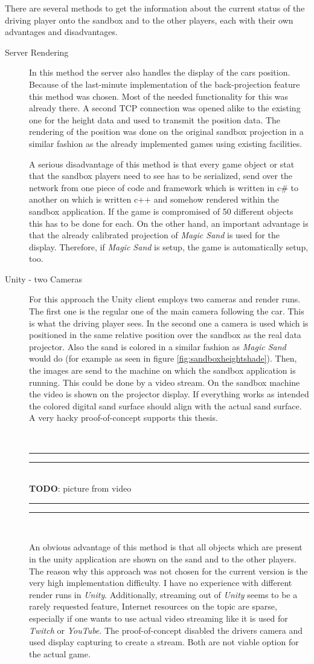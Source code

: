 \documentclass[12pt,a4paper,twoside,titlepage,headsepline,numbers=noenddot,listof=totoc,index=totoc,bibliography=totoc]{scrartcl}
\theoremstyle{break}
\providecommand{\TODO}[1]{{\small ~\\\hrule\vspace{0.1cm}\hrule~\\\textbf{TODO}:  #1~\\\hrule\vspace{0.1cm}\hrule~\\}}
\begin{document}
There are several methods to get the information about the current status of the driving player onto the sandbox and to the other players, each with their own advantages and disadvantages.  

\begin{description}
	\item[Server Rendering] In this method the server also handles the display of the cars position. Because of the last-minute implementation of the back-projection feature this method was chosen. Most of the needed functionality for this was already there. A second TCP connection was opened alike to the existing one for the height data and used to transmit the position data. The rendering of the position was done on the original sandbox projection in a similar fashion as the already implemented games using existing facilities. 
	
	A serious disadvantage of this method is that every game object or stat that the sandbox players need to see has to be serialized, send over the network from one piece of code and framework which is written in c\# to another on which is written c++ and somehow rendered within the sandbox application. If the game is compromised of 50 different objects this has to be done for each. On the other hand, an important advantage is that the already calibrated projection of \textit{Magic Sand} is used for the display. Therefore, if \textit{Magic Sand} is setup, the game is automatically setup, too.
	
	\item[Unity - two Cameras] For this approach the Unity client employs two cameras and render runs. The first one is the regular one of the main camera following the car. This is what the driving player sees. In the second one a camera is used which is positioned in the same relative position over the sandbox as the real data projector. Also the sand is colored in a similar fashion as \textit{Magic Sand} would do (for example as seen in figure \ref{fig:sandboxheightshade}). Then, the images are send to the machine on which the sandbox application is running. This could be done by a video stream. On the sandbox machine the video is shown on the projector display. If everything works as intended the colored digital sand surface should align with the actual sand surface. A very hacky proof-of-concept supports this thesis. 	\TODO{picture from video}
	
	An obvious advantage of this method is that all objects which are present in the unity application are shown on the sand and to the other players. The reason why this approach was not chosen for the current version is the very high implementation difficulty. I have no experience with different render runs in \textit{Unity}. Additionally, streaming out of \textit{Unity} seems to be a rarely requested feature, Internet resources on the topic are sparse, especially if one wants to use actual video streaming like it is used for \textit{Twitch} or \textit{YouTube}. The proof-of-concept disabled the drivers camera and used display capturing to create a stream. Both are not viable option for the actual game.	
	

\end{description}
\end{document}
